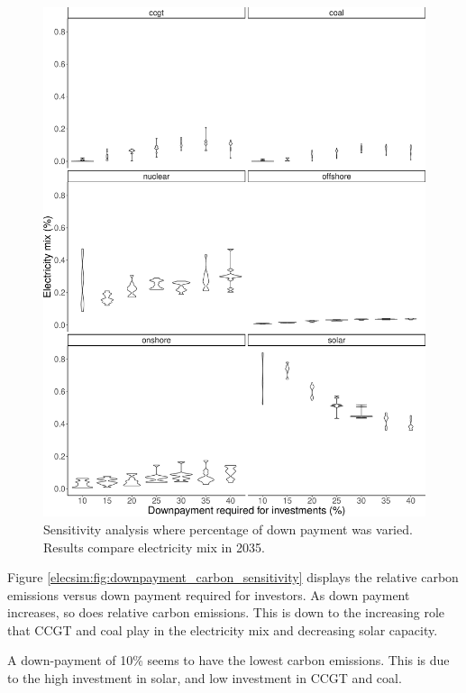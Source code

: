 \begin{figure}
	\centering
	\includegraphics[width=0.9\linewidth]{Chapter4/figures/sensitvity_analysis/downpayment_sensitivity_analysis.pdf}
	\caption{Sensitivity analysis where percentage of down payment was varied. Results compare electricity mix in 2035.}
	\label{elecsim:fig:downpayment_sensitivity}
\end{figure}

Figure \ref{elecsim:fig:downpayment_carbon_sensitivity} displays the relative carbon emissions versus down payment required for investors. As down payment increases, so does relative carbon emissions. This is down to the increasing role that CCGT and coal play in the electricity mix and decreasing solar capacity. 

A down-payment of 10\% seems to have the lowest carbon emissions. This is due to the high investment in solar, and low investment in CCGT and coal. 

